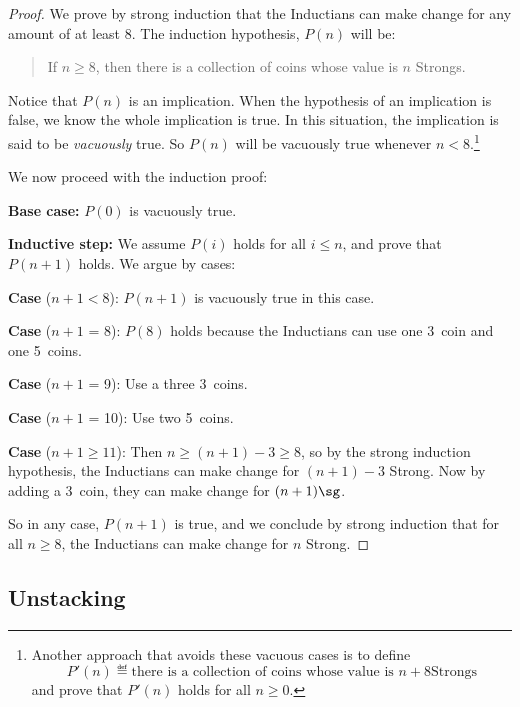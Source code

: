\begin{proof}

  We prove by strong induction that the Inductians can make change for any
  amount of at least 8\sg.  The induction hypothesis, $P(n)$ will be:
\begin{quote}
If $n \geq 8$, then there is a collection of coins whose value is $n$
Strongs.
\end{quote}

Notice that $P(n)$ is an implication.  When the hypothesis of an
implication is false, we know the whole implication is true.  In this
situation, the implication is said to be \emph{vacuously} true.  So $P(n)$
will be vacuously true whenever $n < 8$.\footnote{Another approach that
avoids these vacuous cases is to define
\[
P'(n) \eqdef \text{there is a collection of coins whose value is $n+8$
Strongs}
\]
and prove that $P'(n)$ holds for all $n \geq 0$.
\iffalse
The solution to
\href{http://courses.csail.mit.edu/6.042/spring06/solutions/cp3fsol.pdf}
{Class Problem 1 from Spring '06, Friday, Feb. 24} uses this approach.\fi
}

We now proceed with the induction proof:

\textbf{Base case:} $P(0)$ is vacuously true.

\textbf{Inductive step:}  We assume $P(i)$ holds for all $i \leq n$, and
prove that $P(n+1)$ holds.  We argue by cases:

\textbf{Case} ($n+1 < 8$): $P(n+1)$ is vacuously true in this case.

\textbf{Case} ($n+1$ = 8): $P(8)$ holds because the Inductians can use one
3\sg\ coin and one 5\sg\ coins.

\textbf{Case} ($n+1$ = 9): Use a three 3\sg\ coins.

\textbf{Case} ($n+1$ = 10): Use two 5\sg\ coins.

\textbf{Case} ($n+1 \geq 11$): Then $n \geq (n+1) -3 \geq 8$, so by the
strong induction hypothesis, the Inductians can make change for $(n+1)-3$
Strong.  Now by adding a 3\sg\ coin, they can make change for $(n+1)\sg$.

So in any case, $P(n+1)$ is true, and we conclude by strong induction that
for all $n \geq 8$, the Inductians can make change for $n$ Strong.

\end{proof}


\subsection{Unstacking}

